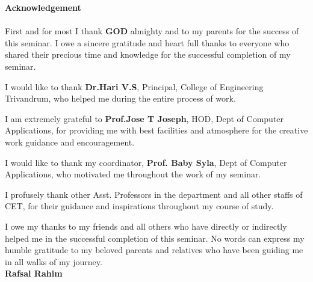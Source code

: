 \begin{titlepage}
\begin{center}
\textbf{\LARGE{Acknowledgement}}\\[0.5cm] 
\end{center}
\paragraph{}
First and for most I thank \textbf{GOD} almighty and to my parents for the success of this seminar. I owe a sincere gratitude and heart full thanks to everyone who shared their precious time and knowledge for the successful completion of my seminar.

I would like to thank \textbf{Dr.Hari V.S}, Principal,  College of Engineering Trivandrum, who helped me during the entire process of work.

I am extremely grateful to \textbf{Prof.Jose T Joseph}, HOD, Dept of Computer Applications, for providing me with best facilities and atmosphere for the creative work guidance and encouragement.

I would like to thank my coordinator,\textbf{ Prof. Baby Syla}, Dept of Computer Applications, who motivated me throughout the work of my seminar.  

I profusely thank other Asst. Professors in the department and all other staffs of CET, for their guidance and inspirations throughout my course of study.

I owe my thanks to my friends and all others who have directly or indirectly helped me in the successful completion of this seminar. No words can express my humble gratitude to my beloved parents and relatives who have been guiding me in all walks of my journey.\\

 \vspace{1.1cm}
\hspace{345pt} \textbf{Rafsal Rahim}


\end{titlepage}
